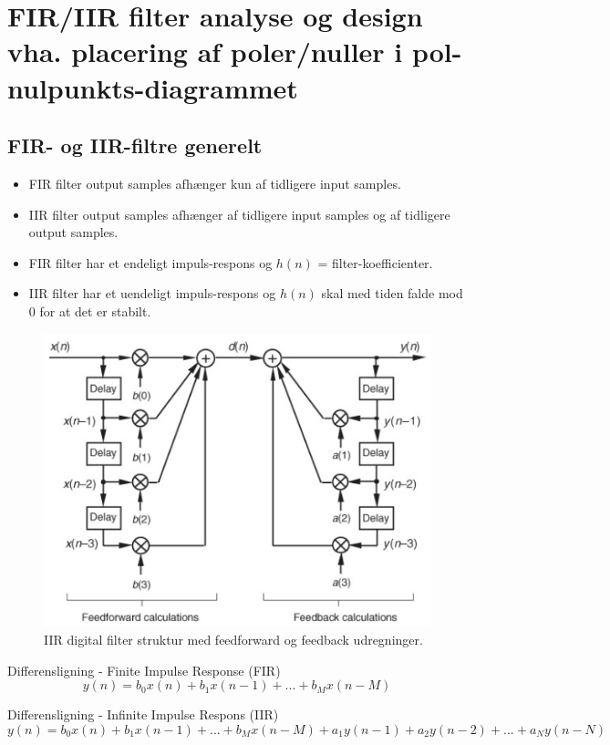 \documentclass[danish]{article}
\begin{document}
\newpage
\section{FIR/IIR filter analyse og design vha. placering af poler/nuller i pol-nulpunkts-diagrammet}

\subsection{FIR- og IIR-filtre generelt}
\begin{itemize} 
	\item FIR filter output samples afhænger kun af tidligere input samples.
	\item IIR filter output samples afhænger af tidligere input samples og af tidligere  output samples.
	\item FIR filter har et endeligt impuls-respons og $h(n)$ = filter-koefficienter.
	\item IIR filter har et uendeligt impuls-respons og $h(n)$ skal med tiden falde mod 0 for at det er stabilt. 
\end{itemize}

\begin{figure}[H]
	\centering
	\includegraphics[width=0.6\linewidth]{graphics/iir}
	\caption{IIR digital filter struktur med feedforward og feedback udregninger.}
	\label{fig:iir}
\end{figure}

Differensligning - Finite Impulse Response (FIR)
\begin{equation}
y(n) = b_0 x(n) + b_1 x(n-1) + ... + b_M x(n-M)
\end{equation}

Differensligning - Infinite Impulse Respons (IIR)
\begin{equation}
y(n) = b_0 x(n) + b_1 x(n-1) + ... + b_M x(n-M) + a_1 y(n-1) + a_2 y(n-2) + ... + a_N y(n-N)
\end{equation}
\end{document}
